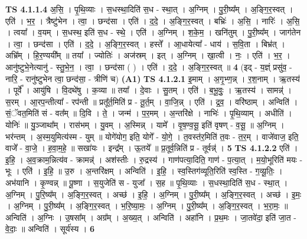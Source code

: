 \documentclass[17pt]{extarticle}
\begin{document}
                  \newline
                                \textbf{ TS 4.1.1.4} \newline
                  अ॒सि॒ । पृ॒थि॒व्याः । स॒धस्था॒दिति॑ स॒ध - स्था॒त् । अ॒ग्निम् । पु॒री॒ष्य᳚म् । अ॒ङ्गि॒र॒स्वत् । एति॑ । भ॒र॒ । त्रैष्टु॑भेन । त्वा॒ । छन्द॑सा । एति॑ । द॒दे॒ । अ॒ङ्गि॒र॒स्वत् । बभ्रिः॑ । अ॒सि॒ । नारिः॑ । अ॒सि॒ । त्वया᳚ । व॒यम् । स॒धस्थ॒ इति॑ स॒ध - स्थे॒ । एति॑ । अ॒ग्निम् । श॒के॒म॒ । खनि॑तुम् । पु॒री॒ष्य᳚म् । जाग॑तेन । त्वा॒ । छन्द॑सा । एति॑ । द॒दे॒ । अ॒ङ्गि॒र॒स्वत् । हस्ते᳚ । आ॒धायेत्या᳚ - धाय॑ । स॒वि॒ता । बिभ्र॑त् । अभ्रि᳚म् । हि॒र॒ण्ययी᳚म् ॥ तया᳚ । ज्योतिः॑ । अज॑स्रम् । इत् । अ॒ग्निम् । खा॒त्वी । नः॒ । एति॑ । भ॒र॒ । आनु॑ष्टुभे॒नेत्यानु॑ - स्तु॒भे॒न॒ । त्वा॒ । छन्द॑सा ( ) । एति॑ । द॒दे॒ । अ॒ङ्गि॒र॒स्वत् ॥ \textbf{  4 } \newline
                  \newline
                      (इद् - य॒ज्ञ्ं प्रसु॑व॒ - नारि॒ - रानु॑ष्टुभेन त्वा॒ छन्द॑सा॒ - त्रीणि॑ च)  \textbf{(A1)} \newline \newline
                                \textbf{ TS 4.1.2.1} \newline
                  इ॒माम् । अ॒गृ॒भ्ण॒न्न् । र॒श॒नाम् । ऋ॒तस्य॑ । पूर्वे᳚ । आयु॑षि । वि॒दथे॑षु । क॒व्या ॥ तया᳚ । दे॒वाः । सु॒तम् । एति॑ । ब॒भू॒वुः॒ । ऋ॒तस्य॑ । सामन्न्॑ । स॒रम् । आ॒रप॒न्तीत्या᳚ - रप॑न्ती ॥ प्रतू᳚र्त॒मिति॑ प्र - तू॒र्त॒म् । वा॒जि॒न्न् । एति॑ । द्र॒व॒ । वरि॑ष्ठाम् । अन्विति॑ । सं॒ॅवत॒मिति॑ सं - वत᳚म् ॥ दि॒वि । ते॒ । जन्म॑ । प॒र॒मम् । अ॒न्तरि॑क्षे । नाभिः॑ । पृ॒थि॒व्याम् । अधीति॑ । योनिः॑ ॥ यु॒ञ्जाथा᳚म् । रास॑भम् । यु॒वम् । अ॒स्मिन्न् । यामे᳚ । वृ॒ष॒ण्व॒सू॒ इति॑ वृषण् - व॒सू॒ ॥ अ॒ग्निम् । भर॑न्तम् । अ॒स्म॒युमित्य॑स्म - युम् ॥ योगे॑योग॒ इति॒ योगे᳚ - यो॒गे॒ । त॒वस्त॑र॒मिति॑ त॒वः - त॒र॒म् । वाजे॑वाज॒ इति॒ वाजे᳚ - वा॒जे॒ । ह॒वा॒म॒हे॒ ॥ सखा॑यः । इन्द्र᳚म् । ऊ॒तये᳚ ॥ प्र॒तूर्व॒न्निति॑ प्र - तूर्वन्न्॑ । \textbf{  5} \newline
                  \newline
                                \textbf{ TS 4.1.2.2} \newline
                  एति॑ । इ॒हि॒ । अ॒व॒क्राम॒न्नित्य॑व - क्रामन्न्॑ । अश॑स्तीः । रु॒द्रस्य॑ । गाण॑पत्या॒दिति॒ गाण॑ - प॒त्या॒त् । म॒यो॒भूरिति॑ मयः - भूः । एति॑ । इ॒हि॒ ॥ उ॒रु । अ॒न्तरि॑क्षम् । अन्विति॑ । इ॒हि॒ । स्व॒स्तिग॑व्यूति॒रिति॑ स्व॒स्ति - ग॒व्यू॒तिः॒ । अभ॑यानि । कृ॒ण्वन्न् ॥ पू॒ष्णा । स॒युजेति॑ स - युजा᳚ । स॒ह ॥ पृ॒थि॒व्याः । स॒धस्था॒दिति॑ स॒ध - स्था॒त् । अ॒ग्निम् । पु॒रि॒ष्य᳚म् । अ॒ङ्गि॒र॒स्वत् । अच्छ॑ । इ॒हि॒ । अ॒ग्निम् । पु॒री॒ष्य᳚म् । अ॒ङ्गि॒र॒स्वत् । अच्छ॑ । इ॒मः॒ । अ॒ग्निम् । पु॒री॒ष्य᳚म् । अ॒ङ्गि॒र॒स्वत् । भ॒रि॒ष्या॒मः॒ । अ॒ग्निम् । पु॒री॒ष्य᳚म् । अ॒ङ्गि॒र॒स्वत् । भ॒रा॒मः॒ ॥ अन्विति॑ । अ॒ग्निः । उ॒षसा᳚म् । अग्र᳚म् । अ॒ख्य॒त् । अन्विति॑ । अहा॑नि । प्र॒थ॒मः । जा॒तवे॑दा॒ इति॑ जा॒त - वे॒दाः॒ ॥ अन्विति॑ । सूर्य॑स्य । \textbf{  6} \newline
\end{document}

